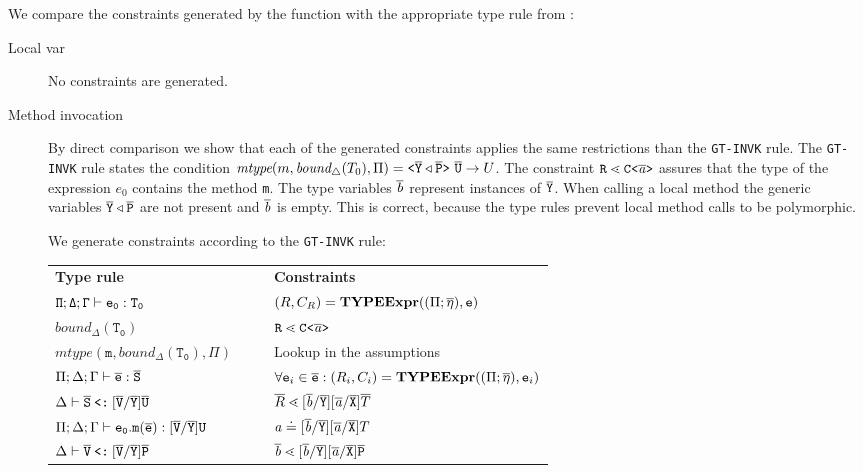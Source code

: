 We compare the constraints generated by the \typeExpr{} function with the appropriate type rule from \TFGJ:
\begin{description}
  \item [Local var]
  No constraints are generated.
  \item[Method invocation]
By direct comparison we show that each of the generated constraints applies the same restrictions than the \texttt{GT-INVK} rule.
The \texttt{GT-INVK} rule states the condition $\textit{mtype}(m, \textit{bound}_\triangle(T_0), \Pi) = \mathtt{ \texttt{<} \overline{\tt Y} \triangleleft \overline{\tt P} \texttt{>} }\ \overline{\tt U} \to U$.
The constraint $\texttt{R} \lessdot \mathtt{C \texttt{<} \overline{\tt \mathit{ a }} \texttt{>} }$ assures that the type of the expression $e_0$ contains the method \texttt{m}.
The type variables $\overline{\tt \mathit{ b }}$ represent instances of $\overline{\tt Y}$.
When calling a local method the generic variables $\overline{\tt Y} \triangleleft \overline{\tt P}$ are not present and $\overline{\tt \mathit{ b }}$ is empty.
This is correct, because the \TFGJ type rules prevent local method calls to be polymorphic.

We generate constraints according to the \texttt{GT-INVK} rule:\\
\begin{small}
\begin{tabularx}{\linewidth}{lX|Xl}
  \textbf{\TFGJ{} Type rule} &&& \textbf{Constraints} \\
  $\mathtt{\Pi;\Delta;\Gamma \vdash e_0 : T_0 }$ &&&
    $({R}, C_R) = \textbf{TYPEExpr}(({\Pi} ;\overline{\mathtt{\eta}}), \texttt{e})$\\ 
  $\mathtt{\mathit{bound}_\Delta (T_0)}$ &&& $\texttt{R} \lessdot \mathtt{C \texttt{<} \overline{\tt \mathit{ a }} \texttt{>} }$ \\
  $\mathtt{\mathit{mtype}(m, \mathit{bound}_\Delta (T_0), \Pi)}$ &&& Lookup in the assumptions \\
 $\Pi;\Delta;\Gamma \vdash \overline{\tt e} : \overline{\tt S}$ &&& $\forall \texttt{e}_i \in \overline{\tt e} : (R_i, C_i) = \textbf{TYPEExpr}(({\Pi} ;
 \overline{\mathtt{\eta}}), \texttt{e}_i)$\\
 $\Delta \vdash \overline{\tt S} \mathbin{\texttt{<:}}  [\overline{\tt V}/\overline{\tt Y}]\overline{\tt U}$ &&& $ \overline{R} \lessdot [\overline{\tt \mathit{ b }}/\overline{\tt Y}][\overline{\tt \mathit{ a }}/\overline{\tt X}]\overline{T}$\\
 $\Pi;\Delta;\Gamma \vdash \mathtt{e_0.m(\overline{e}) : [\overline{\tt V}/\overline{\tt Y}]U }$ &&& $ \mathit{ a } \doteq [\overline{\tt \mathit{ b }}/\overline{\tt Y}][\overline{\tt \mathit{ a }}/\overline{\tt X}]{T}$ \\
 $\Delta \vdash \overline{\tt V} \mathbin{\texttt{<:}}  [\overline{\tt V}/\overline{\tt Y}]\overline{\tt P}$ &&& $\overline{\tt \mathit{ b }} \lessdot [\overline{\tt \mathit{ b }}/\overline{\tt Y}][\overline{\tt \mathit{ a }}/\overline{\tt X}]\overline{\tt P}$ \\
\end{tabularx}
\end{small}


\end{description}

